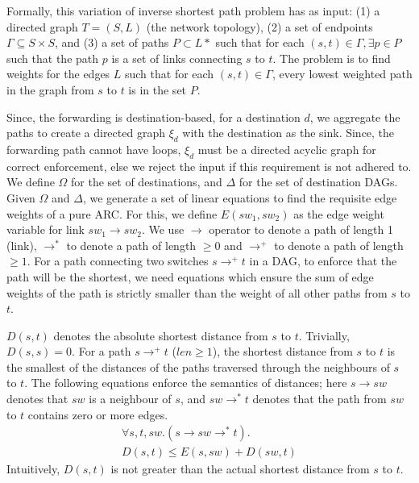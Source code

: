 Formally, this variation of inverse shortest path problem 
has as input: (1) a directed graph $T = (S, L)$ (the network topology), 
(2) a set of endpoints $\Gamma \subseteq S\times S$, and 
(3) a set of paths $P \subset L*$
such that for each $(s,t) \in \Gamma, \exists p \in P$ such
that the path $p$ is a set of links connecting $s$ to $t$. 
The problem is to find weights for the edges $L$ such that 
for each $(s,t) \in \Gamma$, every lowest weighted path 
in the graph 
from $s$ to $t$ is in the set $P$. 

Since, the forwarding is destination-based,
for a destination $d$, we aggregate the paths 
to create a directed graph $\xi_d$ with the destination
as the sink. Since, the forwarding path cannot have 
loops, $\xi_d$ must be a directed acyclic graph for 
correct enforcement, else we reject the input if this
requirement is not adhered to.
We define $\Omega$ for the 
set of destinations, and $\Delta$ for  
the set of destination DAGs. 
Given $\Omega$ and $\Delta$, we generate a set of linear equations
to find the requisite edge weights of a pure ARC. 
For this, we define $E(sw_1, sw_2)$ as
the edge weight variable for link $sw_1 \rightarrow sw_2$. 
We use $\rightarrow$ operator to denote a path of length 1 
(link), $\rightarrow^*$ to denote a path of length $\geq 0$
and $\rightarrow^+$ to denote a path of length $\geq 1$.
For a path connecting two switches 
$s \rightarrow^+ t$ in a DAG, 
to enforce that the path will be the shortest, we need equations
which ensure the sum of edge weights of the path is strictly smaller than
the weight of all other paths from $s$ to $t$. 

$D(s,t)$ denotes the absolute shortest distance from $s$ to $t$. 
Trivially, $D(s,s) = 0$. For a path $s \rightarrow^+ t$ ($len \geq 1$),
the shortest distance from $s$ to $t$ is the smallest of the distances
of the paths traversed through the neighbours of $s$ to $t$. The
following equations enforce the semantics of distances; 
here $s \rightarrow sw$ denotes that $sw$ is a neighbour
of $s$, and $sw \rightarrow^* t$ denotes that the path from $sw$ to $t$ contains
zero or more edges.
\begin{multline} \label{eq:dist}
\forall s, t, sw. (s \rightarrow sw \rightarrow^* t).\\
D(s, t) \leq E(s, sw) + D(sw, t)
\end{multline}
Intuitively, $D(s,t)$ is not greater than 
the actual shortest distance from $s$ to $t$.

